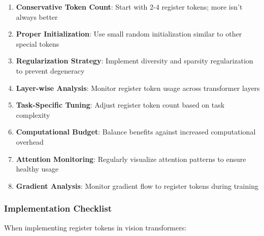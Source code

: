 \begin{enumerate}
\item \textbf{Conservative Token Count}: Start with 2-4 register tokens; more isn't always better
\item \textbf{Proper Initialization}: Use small random initialization similar to other special tokens
\item \textbf{Regularization Strategy}: Implement diversity and sparsity regularization to prevent degeneracy
\item \textbf{Layer-wise Analysis}: Monitor register token usage across transformer layers
\item \textbf{Task-Specific Tuning}: Adjust register token count based on task complexity
\item \textbf{Computational Budget}: Balance benefits against increased computational overhead
\item \textbf{Attention Monitoring}: Regularly visualize attention patterns to ensure healthy usage
\item \textbf{Gradient Analysis}: Monitor gradient flow to register tokens during training
\end{enumerate}
\begin{comment}
Feedback: This is a good list. To make it more actionable and direct for a practitioner:
1.  **Conservative Token Count**: "Start with a small number of register tokens (4 is a common default). Only increase this number if you observe attention sink issues or if performance on your downstream task plateaus."
2.  **Regularization Strategy**: "If you find your register tokens are all learning similar representations (i.e., they are redundant), implement a simple cosine similarity loss between them to encourage diversity."
3.  **Attention Monitoring**: "The key diagnostic for register tokens is attention visualization. If they are not receiving significant attention from patch tokens in the middle-to-late layers of the model, they are likely not contributing positively and could be removed."
\end{comment}

\subsubsection{Implementation Checklist}

When implementing register tokens in vision transformers:

